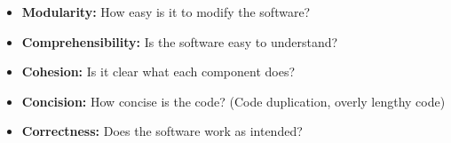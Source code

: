 \documentclass[
../../Software_Engineering_Summary.tex,
]
{subfiles}
\begin{document}
\begin{defbox}
    \begin{itemize}
        \item \textbf{Modularity:} How easy is it to modify the software?
        \item \textbf{Comprehensibility:} Is the software easy to understand?
        \item \textbf{Cohesion:} Is it clear what each component does?
        \item \textbf{Concision:} How concise is the code? (Code duplication, overly lengthy code)
        \item \textbf{Correctness:} Does the software work as intended?
    \end{itemize}
\end{defbox}
\end{document}
